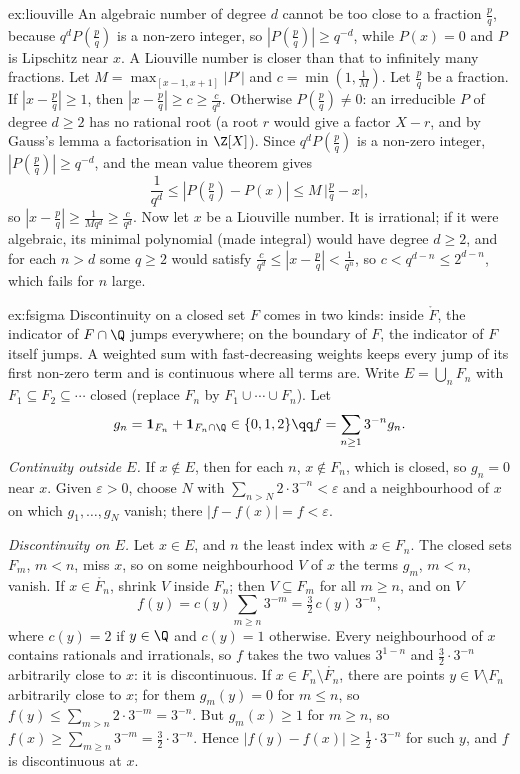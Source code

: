 \begin{solution}{ex:liouville}
\idea An algebraic number of degree $d$ cannot be too close to a fraction $\frac pq$, because $q^dP(\frac pq)$ is a non-zero integer, so $|P(\frac pq)|\ge q^{-d}$, while $P(x)=0$ and $P$ is
Lipschitz near $x$. A Liouville number is closer than that to infinitely many fractions.
\writeup Let $M=\max_{[x-1,x+1]}|P'|$ and $c=\min(1,\frac1M)$. Let $\frac pq$ be a fraction. If $|x-\frac pq|\ge1$, then $|x-\frac pq|\ge c\ge\frac c{q^d}$. Otherwise $P(\frac pq)\ne0$: an irreducible $P$ of degree
$d\ge2$ has no rational root (a root $r$ would give a factor $X-r$, and by Gauss's lemma a factorisation in $\Z[X]$). Since $q^dP(\frac pq)$ is a non-zero integer,
$|P(\frac pq)|\ge q^{-d}$, and the mean value theorem gives
\[\frac1{q^d}\le|P(\tfrac pq)-P(x)|\le M\,\bigl|\tfrac pq-x\bigr|,\]
so $|x-\frac pq|\ge\frac1{Mq^d}\ge\frac c{q^d}$. Now let $x$ be a Liouville number. It is irrational; if it were algebraic, its minimal polynomial (made integral) would have
degree $d\ge2$, and for each $n>d$ some $q\ge2$ would satisfy $\frac c{q^d}\le|x-\frac pq|<\frac1{q^n}$, so $c<q^{d-n}\le2^{d-n}$, which fails for $n$ large.
\end{solution}

\begin{solution}{ex:fsigma}
\idea Discontinuity on a closed set $F$ comes in two kinds: inside $\mathring F$, the indicator of $F\cap\Q$ jumps everywhere; on the boundary of $F$, the
indicator of $F$ itself jumps. A weighted sum with fast-decreasing weights keeps every jump of its first non-zero term and is continuous
where all terms are.
\writeup Write $E=\bigcup_nF_n$ with $F_1\subseteq F_2\subseteq\cdots$ closed (replace $F_n$ by $F_1\cup\cdots\cup F_n$). Let
\[g_n=\mathbf 1_{F_n}+\mathbf 1_{F_n\cap\Q}\in\{0,1,2\}\qq f=\sum_{n\ge1}3^{-n}g_n.\]
\emph{Continuity outside $E$.} If $x\notin E$, then for each $n$, $x\notin F_n$, which is closed, so $g_n=0$ near $x$. Given $\varepsilon>0$, choose $N$ with $\sum_{n>N}2\cdot3^{-n}<\varepsilon$ and a
neighbourhood of $x$ on which $g_1,\dots,g_N$ vanish; there $|f-f(x)|=f<\varepsilon$.

\emph{Discontinuity on $E$.} Let $x\in E$, and $n$ the least index with $x\in F_n$. The closed sets $F_m$, $m<n$, miss $x$, so on some neighbourhood $V$ of $x$ the terms $g_m$, $m<n$,
vanish. If $x\in\mathring{F_n}$, shrink $V$ inside $F_n$; then $V\subseteq F_m$ for all $m\ge n$, and on $V$
\[f(y)=c(y)\sum_{m\ge n}3^{-m}=\tfrac32\,c(y)\,3^{-n},\]
where $c(y)=2$ if $y\in\Q$ and $c(y)=1$ otherwise.
Every neighbourhood of $x$ contains rationals and irrationals, so $f$ takes the two values $3^{1-n}$ and $\frac32\cdot3^{-n}$ arbitrarily close to $x$: it is discontinuous. If
$x\in F_n\setminus\mathring{F_n}$, there are points $y\in V\setminus F_n$ arbitrarily close to $x$; for them $g_m(y)=0$ for $m\le n$, so $f(y)\le\sum_{m>n}2\cdot3^{-m}=3^{-n}$. But $g_m(x)\ge1$ for $m\ge n$, so
$f(x)\ge\sum_{m\ge n}3^{-m}=\frac32\cdot3^{-n}$. Hence $|f(y)-f(x)|\ge\frac12\cdot3^{-n}$ for such $y$, and $f$ is discontinuous at $x$.
\end{solution}

